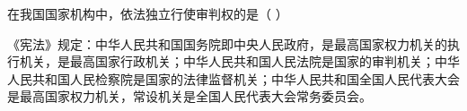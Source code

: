 \question 在我国国家机构中，依法独立行使审判权的是（ ）
\par{}
\begin{solution}《宪法》规定：中华人民共和国国务院即中央人民政府，是最高国家权力机关的执行机关，是最高国家行政机关；中华人民共和国人民法院是国家的审判机关；中华人民共和国人民检察院是国家的法律监督机关；中华人民共和国全国人民代表大会是最高国家权力机关，常设机关是全国人民代表大会常务委员会。
\end{solution}
